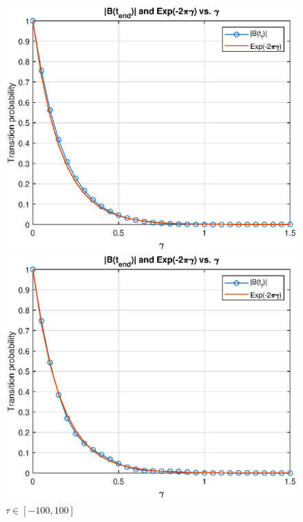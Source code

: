 \documentclass{article}
\theoremstyle{definition}
\begin{document}
\begin{figure}[!htb]
	\begin{minipage}{0.49\textwidth}
		\centering
		\includegraphics[width=\textwidth]{t050.eps}
		\caption{$\tau\in [-50,50]$}
		\includegraphics[width=\textwidth]{t100.eps}
		\caption{$\tau\in [-100,100]$}
	\end{minipage}
	\begin{minipage}{0.49\textwidth}
		\centering

\end{minipage}
\end{figure}
\end{document}

